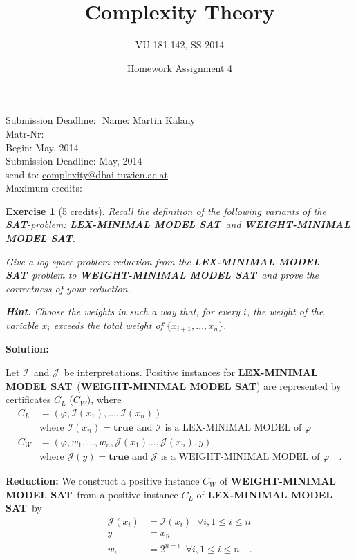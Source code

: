 \documentclass [11pt]{article}
\title{Complexity Theory}
\author{VU 181.142, SS 2014}
\date{Homework Assignment 4}
\newtheorem{exercise}{Exercise}
\renewcommand{\phi}{\varphi}
\newcommand{\SAT}{\mbox{\bf SAT}}
\newcommand{\True}{\mathbf{true}}
\newcommand{\MINWEIGHTSAT}{\textbf{WEIGHT-MINIMAL MODEL SAT}}
\newcommand{\MINLEXSAT}{\textbf{LEX-MINIMAL MODEL SAT}}
\newcommand{\mI}{\ensuremath{\mathcal{I}}}
\newcommand{\mJ}{\ensuremath{\mathcal{J}}}
\newcommand{\fai}{\ensuremath{\forall i, 1 \leq i \leq n}}
\begin{document}
\maketitle

\begin{tabbing}
Submission Deadline: \quad \= \kill
Name: \> Martin Kalany \\
Matr-Nr:  \\
Begin:  May, 2014 \\
Submission Deadline:  May, 2014  \\
send to: \> \url{complexity@dbai.tuwien.ac.at}\\
Maximum credits:  
\end{tabbing}

\medskip
\noindent
\begin{exercise}[5 credits]
{\em 
Recall the definition of the following variants of the \SAT -problem:
\MINLEXSAT\
and \MINWEIGHTSAT.
\smallskip

\noindent
Give a log-space problem reduction 
from the \MINLEXSAT\ problem to 
\MINWEIGHTSAT\ and prove the correctness of your reduction.
}%

\bigskip
\noindent
{\bf Hint.} Choose the weights in such a way that, for
every $i$, the weight of the variable $x_i$ exceeds the total weight
of $\{x_{i+1}, \ldots, x_n\}$.
\end{exercise}

\noindent
\textbf{Solution:}

Let \mI\ and \mJ\ be interpretations. Positive instances for \MINLEXSAT\ (\MINWEIGHTSAT) are represented by certificates $C_L$ ($C_W$), where
\begin{align*}
C_L &= (\phi, \mI(x_1),\dots,\mI(x_n)) \\
&\text{where } \mI(x_n) = \True \text { and } \mI \text{ is a LEX-MINIMAL MODEL of } \phi \\
C_W &= (\phi, w_1,\dots,w_n, \mJ(x_1)\dots,\mJ(x_n), y) \\
&\text{where } \mJ(y) = \True \text { and } \mJ \text{ is a WEIGHT-MINIMAL MODEL of } \phi \quad .
\end{align*}

\noindent
\textbf{Reduction:}
We construct a positive instance $C_W$ of \MINWEIGHTSAT\ from a positive instance $C_L$ of \MINLEXSAT\ by 
\begin{align*}
\mJ(x_i) &= \mI(x_i) \;\;\fai \\
y &= x_n \\
w_i &= 2^{n-i}\;\; \fai \quad .
\end{align*}
\end{document}
